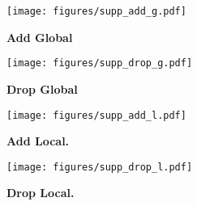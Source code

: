 \documentclass[10pt,twocolumn]{article}
\begin{document}
\begin{figure*}[h]
  \centering
\texttt{[image: figures/supp\_add\_g.pdf]}

   \caption{\bf{Add Global}} 
   \label{fig:supp_add_g}
\end{figure*}


\begin{figure*}[h]
  \centering
\texttt{[image: figures/supp\_drop\_g.pdf]}

   \caption{\bf{Drop Global}} 
   \label{fig:supp_drop_g}
\end{figure*}

\begin{figure*}[h]
  \centering
\texttt{[image: figures/supp\_add\_l.pdf]}

   \caption{{\bf Add Local.}
   }
   \label{fig:supp_add_l}
\end{figure*}

\begin{figure*}[h]
  \centering
\texttt{[image: figures/supp\_drop\_l.pdf]}

   \caption{{\bf Drop Local.}
   }
   \label{fig:supp_drop_l}
\end{figure*}
\end{document}
